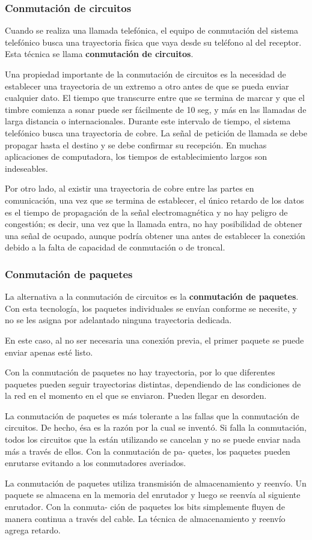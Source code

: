 \subsubsection*{Conmutación de circuitos}
Cuando se realiza una llamada telefónica, el equipo de conmutación del sistema telefónico busca una trayectoria física que vaya desde su teléfono al del receptor. Esta técnica se llama \textbf{conmutación de circuitos}.

Una propiedad importante de la conmutación de circuitos es la necesidad de establecer una trayectoria de un extremo a otro antes de que se pueda enviar cualquier dato. El tiempo que transcurre entre que se termina de marcar y que el timbre comienza a sonar puede ser fácilmente de 10 seg, y más en las llamadas de larga distancia o internacionales. Durante este intervalo de tiempo, el sistema telefónico busca una trayectoria de cobre. La señal de petición de llamada se debe propagar hasta el destino y se debe confirmar su recepción. En muchas aplicaciones de computadora, los tiempos de establecimiento largos son indeseables.

Por otro lado, al existir una trayectoria de cobre entre las partes en comunicación, una vez que se termina de establecer, el único retardo de los datos es el tiempo de propagación de la señal electromagnética y no
hay peligro de congestión; es decir, una vez que la llamada entra, no hay posibilidad de obtener una señal de ocupado, aunque podría obtener una antes de establecer la conexión debido a la falta de capacidad de conmutación o de troncal.

\subsubsection*{Conmutación de paquetes}
La alternativa a la conmutación de circuitos es la \textbf{conmutación de paquetes}. Con esta tecnología, los paquetes individuales se envían conforme se necesite, y no se les asigna por adelantado ninguna trayectoria dedicada.

En este caso, al no ser necesaria una conexión previa, el primer paquete se puede enviar apenas esté listo. 

Con la conmutación de paquetes no
hay trayectoria, por lo que diferentes paquetes pueden seguir trayectorias distintas, dependiendo
de las condiciones de la red en el momento en el que se enviaron. Pueden llegar en desorden.

La conmutación de paquetes es más tolerante a las fallas que la conmutación de circuitos. De  hecho, ésa es la razón por la cual se inventó. Si falla la conmutación, todos los circuitos que la están utilizando se cancelan y no se puede enviar nada más a través de ellos. Con la conmutación de pa-
quetes, los paquetes pueden enrutarse evitando a los conmutadores averiados.

La conmutación de paquetes utiliza transmisión de almacenamiento y reenvío. Un paquete se
almacena en la memoria del enrutador y luego se reenvía al siguiente enrutador. Con la conmuta-
ción de paquetes los bits simplemente fluyen de manera continua a través del cable. La técnica de
almacenamiento y reenvío agrega retardo.